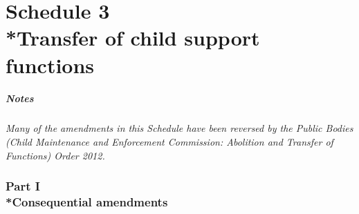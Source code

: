 \documentclass[a4paper]{article}
\newcommand{\parthead}{}
\newcommand\amendment[1]{\subsubsection*{Notes}{\itshape\frenchspacing\footnotesize #1 \par}}
\begin{document}

\part[Schedule 3 --- Transfer of child support functions]{Schedule 3\\*Transfer of child support functions}

\renewcommand\parthead{--- Schedule 3}

\amendment{
Many of the amendments in this Schedule have been reversed by the Public Bodies (Child Maintenance and Enforcement Commission: Abolition and Transfer of Functions) Order 2012.
}

\section[Part I --- Consequential amendments]{Part I\\*Consequential amendments}
\end{document}
